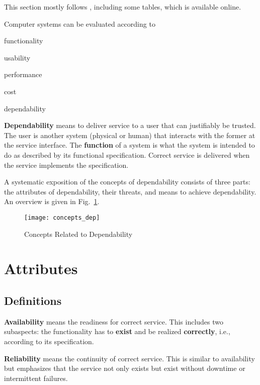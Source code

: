 This section mostly follows \cite{dependability}, including some tables, which is available online.

Computer systems can be evaluated according to
\begin{compactitem}
 \item functionality
 \item usability
 \item performance
 \item cost
 \item dependability
\end{compactitem}

\textbf{Dependability} means to deliver service to a user that can justifiably be trusted.
The user is another system (physical or human) that interacts with the former at the service interface.
The \textbf{function} of a system is what the system is intended to do as described by its functional specification.
Correct service is delivered when the service implements the specification.

A systematic exposition of the concepts of dependability consists of three parts: the attributes of dependability, their threats, and means to achieve dependability.
An overview is given in Fig.~\ref{fig:concepts_dep}.

\begin{figure}
\centering
\texttt{[image: concepts\_dep]}
\caption{Concepts Related to Dependability}
\label{fig:concepts_dep}
\end{figure}

\section{Attributes}

\subsection{Definitions}

\textbf{Availability} means the readiness for correct service.
This includes two subaspects: the functionality has to \textbf{exist} and be realized \textbf{correctly}, i.e., according to its specification.

\textbf{Reliability} means the continuity of correct service.
This is similar to availability but emphasizes that the service not only exists but exist without downtime or intermittent failures.

